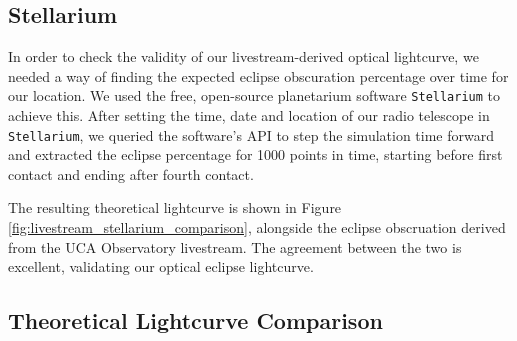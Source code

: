 \subsection{\label{sec:stellarium}Stellarium}

In order to check the validity of our livestream-derived optical lightcurve, we needed a way of finding the expected eclipse obscuration percentage over time for our location.
We used the free, open-source planetarium software \texttt{Stellarium} to achieve this.
After setting the time, date and location of our radio telescope in \texttt{Stellarium}, we queried the software's API to step the simulation time forward and extracted the eclipse percentage for 1000 points in time, starting before first contact and ending after fourth contact.

The resulting theoretical lightcurve is shown in Figure \ref{fig:livestream_stellarium_comparison}, alongside the eclipse obscruation derived from the UCA Observatory livestream.
The agreement between the two is excellent, validating our optical eclipse lightcurve.


\subsection{\label{sec:theoreticalLightcurves}Theoretical Lightcurve Comparison}


